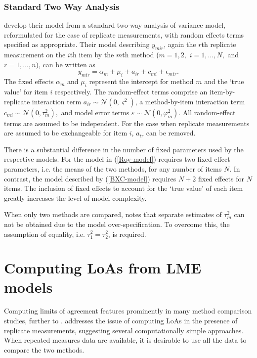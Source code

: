 \documentclass[12pt, a4paper]{report}
\theoremstyle{plain}
\theoremstyle{definition}
\theoremstyle{remark}
\begin{document}
\subsubsection{Standard Two Way Analysis}
\citet{BXC2008} develop their model from a standard two-way analysis of variance model, reformulated for the case of replicate measurements, with random effects terms specified as appropriate. 
Their model describing $y_{mir} $, again the $r$th replicate measurement on the $i$th item by the $m$th method ($m=1,2,$ $i=1,\ldots,N,$ and $r = 1,\ldots,n$), can be written as
\begin{equation}\label{BXC-model}
y_{mir}  = \alpha_{m} + \mu_{i} + a_{ir} + c_{mi} + \epsilon_{mir}.
\end{equation}
The fixed effects $\alpha_{m}$ and $\mu_{i}$  represent the intercept for method $m$ and the `true value' for item $i$ respectively. The random-effect terms comprise an item-by-replicate interaction term $a_{ir} \sim \mathcal{N}(0,\varsigma^{2})$, a method-by-item interaction term $c_{mi} \sim \mathcal{N}(0,\tau^{2}_{m}),$ and model error terms $\varepsilon \sim \mathcal{N}(0,\varphi^{2}_{m}).$ All random-effect terms are assumed to be independent.
For the case when replicate measurements are assumed to be exchangeable for item $i$, $a_{ir}$ can be removed.

There is a substantial difference in the number of fixed parameters used by the respective models. For the model in (\ref{Roy-model}) requires two fixed effect parameters, i.e. the means of the two methods, for any number of items $N$. In contrast, the model described by (\ref{BXC-model}) requires $N+2$ fixed effects for $N$ items. The inclusion of fixed effects to account for the `true value' of each item greatly increases the level of model complexity.

When only two methods are compared, \citet{BXC2008} notes that separate estimates of $\tau^2_m$ can not be obtained due to the model over-specification. To overcome this, the assumption of equality, i.e. $\tau^2_1 = \tau^2_2$, is required.






\newpage
			\section{Computing LoAs from LME models}
			
			Computing limits of agreement features prominently in many method comparison studies, further to \citet{BA86,BA99}.
			\citet{BA99} addresses the issue of computing LoAs in the presence of replicate measurements, suggesting several computationally simple approaches. When repeated measures data are available, it is desirable to use
			all the data to compare the two methods.
			
\end{document}
